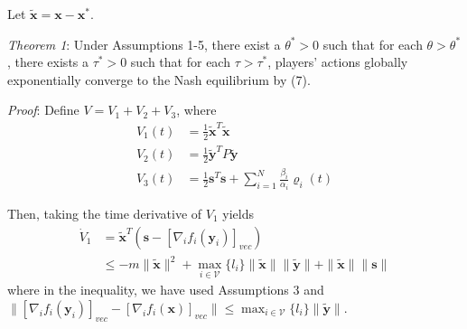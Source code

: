\documentclass[12pt, a4paper, oneside]{ctexbook}
\begin{document}
Let $\tilde{\mathbf{x}} = \mathbf{x} - \mathbf{x}^*$.

\emph{Theorem 1}: Under Assumptions 1-5, there exist a $\theta^* > 0$ such that for each $\theta > \theta^*$, there exists a $\tau^* > 0$ such that for each $\tau > \tau^*$, players' actions globally exponentially converge to the Nash equilibrium by (7).

\emph{Proof}: Define $V = V_1 + V_2 + V_3$, where
\begin{equation}
    \begin{aligned}
        V_1(t) & = \frac{1}{2}\tilde{\mathbf{x}}^{T}\tilde{\mathbf{x}}                                         \\
        V_2(t) & = \frac{1}{2}\tilde{\mathbf{y}}^{T}P\tilde{\mathbf{y}}                                        \\
        V_3(t) & = \frac{1}{2}\mathbf{s}^{T}\mathbf{s} + \sum_{i = 1}^{N} \frac{\beta_i}{\alpha_i}\varrho_i(t)
    \end{aligned}
\end{equation}

Then, taking the time derivative of $V_1$ yields
\begin{equation}
    \begin{aligned}
        \dot{V}_{1} & =\tilde{\mathbf{x}}^{T}(\mathbf{s}-[\nabla_{i}f_{i}(\mathbf{y}_{i})]_{vec})                                                                   \\
                    & \leq-m\|\tilde{\mathbf{x}}\|^2+\max_{i\in\mathcal{V}}\{l_i\}\|\tilde{\mathbf{x}}\|\|\tilde{\mathbf{y}}\|+\|\tilde{\mathbf{x}}\|\|\mathbf{s}\|
    \end{aligned}
\end{equation}
where in the inequality, we have used Assumptions 3 and $\|[\nabla_{i}f_{i}(\mathbf{y}_{i})]_{vec}-[\nabla_{i}f_{i}(\mathbf{x})]_{vec}\|\leq\max_{i\in\mathcal{V}}\{l_{i}\}\|\tilde{\mathbf{y}}\|$.
\end{document}
